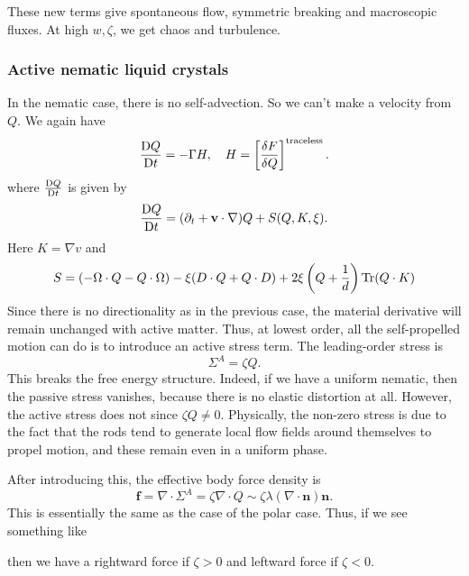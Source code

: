 \documentclass[a4paper]{article}
\begin{document}
These new terms give spontaneous flow, symmetric breaking and macroscopic fluxes. At high $w, \zeta$, we get chaos and turbulence.
\subsubsection*{Active nematic liquid crystals}
In the nematic case, there is no self-advection. So we can't make a velocity from $Q$. We again have
\[
  \frac{\mathrm{D} Q}{\mathrm{D} t} = - \Gamma H,\quad
  H = \left[\frac{\delta F}{\delta Q}\right]^{\text{traceless}}.
\]
where $\frac{\mathrm{D} Q}{\mathrm{D} t}$ is given by
\[
  \frac{\mathrm{D} Q}{\mathrm{D} t} = (\partial_t + \mathbf{v} \cdot \nabla) Q + S(Q, K, \xi).
\]
Here $K = \nabla v$ and
\[
  S = (-\Omega \cdot Q - Q \cdot \Omega) - \xi (D \cdot Q + Q \cdot D) + 2 \xi \left(Q + \frac{1}{d}\right) \operatorname{Tr}(Q \cdot K)
\]
Since there is no directionality as in the previous case, the material derivative will remain unchanged with active matter. Thus, at lowest order, all the self-propelled motion can do is to introduce an active stress term. The leading-order stress is
\[
  \Sigma^A = \zeta Q.
\]
This breaks the free energy structure. Indeed, if we have a uniform nematic, then the passive stress vanishes, because there is no elastic distortion at all. However, the active stress does not since $\zeta Q \not= 0$. Physically, the non-zero stress is due to the fact that the rods tend to generate local flow fields around themselves to propel motion, and these remain even in a uniform phase.

After introducing this, the effective body force density is
\[
  \mathbf{f} = \nabla \cdot \Sigma^A = \zeta \nabla \cdot Q \sim \zeta \lambda (\nabla \cdot \mathbf{n}) \mathbf{n}.
\]
This is essentially the same as the case of the polar case. Thus, if we see something like
\begin{center}
\end{center}
then we have a rightward force if $\zeta > 0$ and leftward force if $\zeta < 0$.
\end{document}

